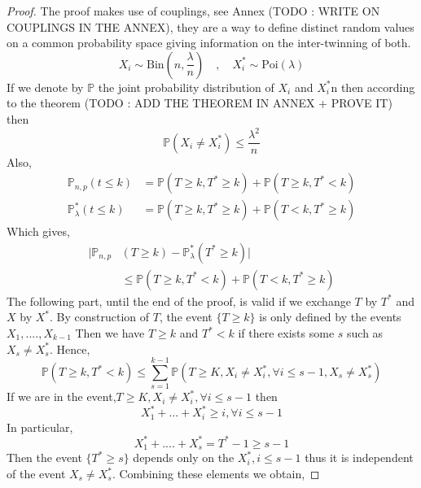 \begin{proof}
	The proof makes use of couplings, see Annex (TODO : WRITE ON COUPLINGS IN THE ANNEX), they are a way to define distinct random values on a common probability space giving information on the inter-twinning of both.
	\begin{equation}
		X_i\sim\text{Bin}(n, \frac{\lambda}{n})\quad,\quad X_i^* \sim\text{Poi}(\lambda)
	\end{equation}
	If we denote by $\mathbb{P}$ the joint probability distribution of $X_i$ and $X_i^*$n then according to the theorem (TODO : ADD THE THEOREM IN ANNEX + PROVE IT) then
	\begin{equation}
		\mathbb{P}(X_i \neq X_i^*) \leq \frac{\lambda^2}{n}
	\end{equation}
	Also, 
	\begin{align}
		\mathbb{P}_{n,p}(t\leq k) &= \mathbb{P}(T\geq k, T^* \geq k) +\mathbb{P}(T\geq k, T^* < k)\\
		\mathbb{P}_{\lambda}^*(t\leq k) &= \mathbb{P}(T\geq k, T^* \geq k) +\mathbb{P}(T< k, T^* \geq k)
	\end{align}
	Which gives,
	\begin{align}
		|\mathbb{P}_{n, p}&(T \geq k) -\mathbb{P}_{\lambda}^*(T^* \geq k)|\\
				  &\leq  \mathbb{P}(T\geq k, T^* < k) +\mathbb{P}(T< k, T^* \geq k)
	\end{align}
	The following part, until the end of the proof, is valid if we exchange $T$ by $T^*$ and $X$ by $X^*$.
	\newline
	By construction of $T$, the event $\{T\geq k\}$ is only defined by the events $X_1, ...., X_{k-1}$
	Then we have $T\geq k$ and $T^*<k$ if there exists some $s$ such as $X_s \neq X_s^*$.
	Hence, 
	\begin{equation}
		\mathbb{P}(T\geq k, T^*<k) \leq \sum_{s=1}^{k-1}\mathbb{P}(T \geq K, X_i \neq X_i^*, \forall i \leq s-1, X_s \neq X_s^*)
	\end{equation}
	If we are in the event,$T \geq K, X_i \neq X_i^*, \forall i \leq s-1$ then
	\begin{equation}
		X_1^*+...+X_i^* \geq i, \forall i \leq s-1
	\end{equation}
	In particular,
	\begin{equation}
		X_1^*+....+X_s^* = T^* - 1 \geq s-1
	\end{equation}
	Then the event $\{T^* \geq s\}$ depends only on the $X_i^*, i\leq s-1$ thus it is independent of the event $X_s \neq X_s^*$.
	Combining these elements we obtain,

\end{proof}
